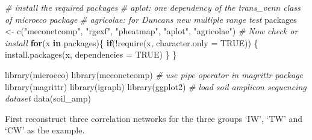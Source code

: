 \documentclass[
]{book}
\newenvironment{Shaded}{\begin{snugshade}}{\end{snugshade}}
\newcommand{\AttributeTok}[1]{\textcolor[rgb]{0.77,0.63,0.00}{#1}}
\newcommand{\CommentTok}[1]{\textcolor[rgb]{0.56,0.35,0.01}{\textit{#1}}}
\newcommand{\ConstantTok}[1]{\textcolor[rgb]{0.00,0.00,0.00}{#1}}
\newcommand{\ControlFlowTok}[1]{\textcolor[rgb]{0.13,0.29,0.53}{\textbf{#1}}}
\newcommand{\FunctionTok}[1]{\textcolor[rgb]{0.00,0.00,0.00}{#1}}
\newcommand{\NormalTok}[1]{#1}
\newcommand{\OtherTok}[1]{\textcolor[rgb]{0.56,0.35,0.01}{#1}}
\newcommand{\SpecialCharTok}[1]{\textcolor[rgb]{0.00,0.00,0.00}{#1}}
\newcommand{\StringTok}[1]{\textcolor[rgb]{0.31,0.60,0.02}{#1}}
\begin{document}
\begin{Shaded}
\begin{Highlighting}[]
\CommentTok{\# install the required packages}
\CommentTok{\# aplot: one dependency of the trans\_venn class of microeco package}
\CommentTok{\# agricolae: for Duncan\textquotesingle{}s new multiple range test}
\NormalTok{packages }\OtherTok{\textless{}{-}} \FunctionTok{c}\NormalTok{(}\StringTok{"meconetcomp"}\NormalTok{, }\StringTok{"rgexf"}\NormalTok{, }\StringTok{"pheatmap"}\NormalTok{, }\StringTok{"aplot"}\NormalTok{, }\StringTok{"agricolae"}\NormalTok{)}
\CommentTok{\# Now check or install}
\ControlFlowTok{for}\NormalTok{(x }\ControlFlowTok{in}\NormalTok{ packages)\{}
    \ControlFlowTok{if}\NormalTok{(}\SpecialCharTok{!}\FunctionTok{require}\NormalTok{(x, }\AttributeTok{character.only =} \ConstantTok{TRUE}\NormalTok{)) \{}
        \FunctionTok{install.packages}\NormalTok{(x, }\AttributeTok{dependencies =} \ConstantTok{TRUE}\NormalTok{)}
\NormalTok{    \}}
\NormalTok{\}}
\end{Highlighting}
\end{Shaded}

\begin{Shaded}
\begin{Highlighting}[]
\FunctionTok{library}\NormalTok{(microeco)}
\FunctionTok{library}\NormalTok{(meconetcomp)}
\CommentTok{\# use pipe operator in magrittr package}
\FunctionTok{library}\NormalTok{(magrittr)}
\FunctionTok{library}\NormalTok{(igraph)}
\FunctionTok{library}\NormalTok{(ggplot2)}
\CommentTok{\# load soil amplicon sequencing dataset}
\FunctionTok{data}\NormalTok{(soil\_amp)}
\end{Highlighting}
\end{Shaded}

First reconstruct three correlation networks for the three groups `IW', `TW' and `CW' as the example.
\end{document}
